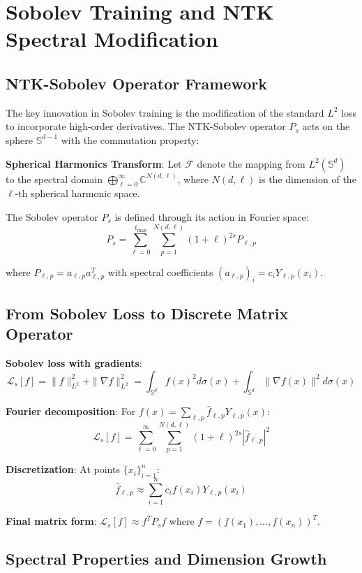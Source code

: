 \documentclass{article}
\begin{document}
\section{Sobolev Training and NTK Spectral Modification}

\subsection{NTK-Sobolev Operator Framework}

The key innovation in Sobolev training is the modification of the standard $L^2$ loss to incorporate high-order derivatives. The NTK-Sobolev operator $P_s$ acts on the sphere $\mathbb{S}^{d-1}$ with the commutation property:

\textbf{Spherical Harmonics Transform}: Let $\mathcal{F}$ denote the mapping from $L^2(\mathbb{S}^d)$ to the spectral domain $\bigoplus_{\ell=0}^{\infty} \mathbb{C}^{N(d,\ell)}$, where $N(d,\ell)$ is the dimension of the $\ell$-th spherical harmonic space.

The Sobolev operator $P_s$ is defined through its action in Fourier space:
\[ P_s = \sum_{\ell=0}^{\ell_{\max}} \sum_{p=1}^{N(d,\ell)} (1+\ell)^{2s}P_{\ell,p} \]

where $P_{\ell,p} = a_{\ell,p}a_{\ell,p}^T$ with spectral coefficients $(a_{\ell,p})_i = c_iY_{\ell,p}(x_i)$.

\subsection{From Sobolev Loss to Discrete Matrix Operator}

\textbf{Sobolev loss with gradients}:
\[ \mathcal{L}_s[f] = \|f\|_{L^2}^2 + \|\nabla f\|_{L^2}^2 = \int_{\mathbb{S}^d} f(x)^2 d\sigma(x) + \int_{\mathbb{S}^d} \|\nabla f(x)\|^2 d\sigma(x) \]

\textbf{Fourier decomposition}: For $f(x) = \sum_{\ell,p} \hat{f}_{\ell,p} Y_{\ell,p}(x)$:
\[ \mathcal{L}_s[f] = \sum_{\ell=0}^{\infty} \sum_{p=1}^{N(d,\ell)} (1+\ell)^{2s} |\hat{f}_{\ell,p}|^2 \]

\textbf{Discretization}: At points $\{x_i\}_{i=1}^n$:
\[ \hat{f}_{\ell,p} \approx \sum_{i=1}^n c_i f(x_i) Y_{\ell,p}(x_i) \]

\textbf{Final matrix form}: $\mathcal{L}_s[f] \approx f^T P_s f$ where $f = (f(x_1), \ldots, f(x_n))^T$.

\subsection{Spectral Properties and Dimension Growth}
\end{document}
